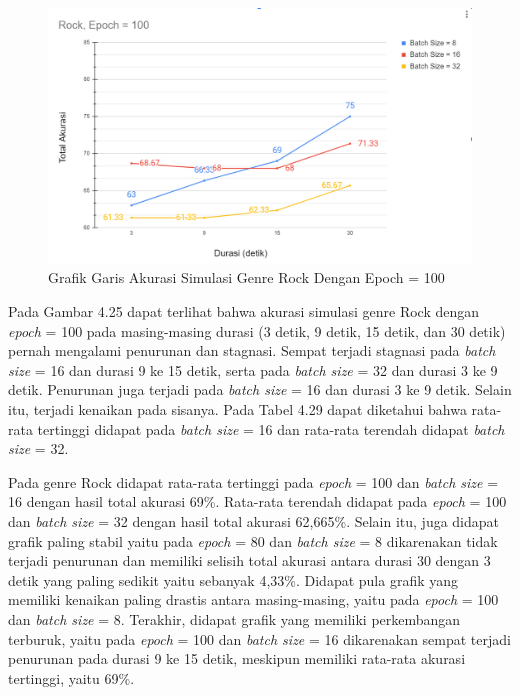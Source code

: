 \begin{enumerate}
		\begin{figure}[H]
			\centering
			
			\includegraphics[width=\textwidth]{gambar/e100_chart_sum accuracy_rock}
			
			\caption{Grafik Garis Akurasi Simulasi Genre Rock Dengan Epoch = 100}
			\label{fig:rocksumcharte100}
		\end{figure}
		
		Pada Gambar 4.25 dapat terlihat bahwa akurasi simulasi genre Rock dengan \emph{epoch} = 100 pada masing-masing durasi (3 detik, 9 detik, 15 detik, dan 30 detik) pernah mengalami penurunan dan stagnasi. Sempat terjadi stagnasi pada \emph{batch size} = 16 dan durasi 9 ke 15 detik, serta pada \emph{batch size} = 32 dan durasi 3 ke 9 detik. Penurunan juga terjadi pada \emph{batch size} = 16 dan durasi 3 ke 9 detik.  Selain itu, terjadi kenaikan pada sisanya. Pada Tabel 4.29 dapat diketahui bahwa rata-rata tertinggi didapat pada \emph{batch size} = 16 dan rata-rata terendah didapat \emph{batch size} = 32.
		
		Pada genre Rock didapat rata-rata tertinggi pada \emph{epoch} = 100 dan \emph{batch size} = 16 dengan hasil total akurasi 69\%. Rata-rata terendah didapat pada \emph{epoch} = 100 dan \emph{batch size} = 32 dengan hasil total akurasi 62,665\%. Selain itu, juga didapat grafik paling stabil yaitu pada \emph{epoch} = 80 dan \emph{batch size} = 8 dikarenakan tidak terjadi penurunan dan memiliki selisih total akurasi antara durasi 30 dengan 3 detik yang paling sedikit yaitu sebanyak 4,33\%. Didapat pula grafik yang memiliki kenaikan paling drastis antara masing-masing, yaitu pada \emph{epoch} = 100 dan \emph{batch size} = 8. Terakhir, didapat grafik yang memiliki perkembangan terburuk, yaitu pada \emph{epoch} = 100 dan \emph{batch size} = 16 dikarenakan sempat terjadi penurunan pada durasi 9 ke 15 detik, meskipun memiliki rata-rata akurasi tertinggi, yaitu 69\%.
		

\end{enumerate}
